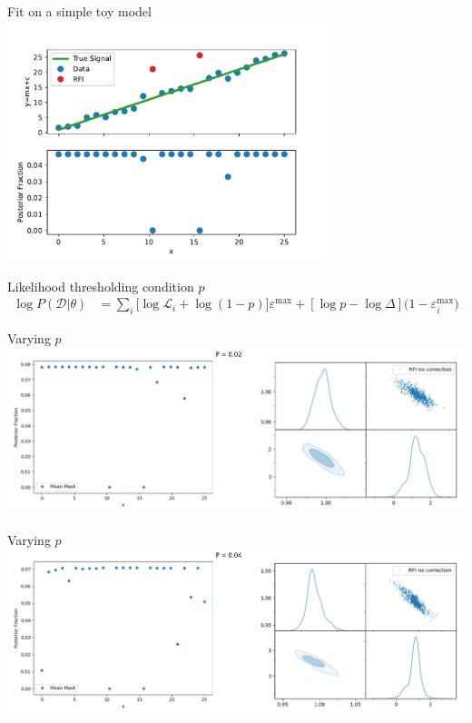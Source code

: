 \documentclass[aspectratio=169]{beamer}
\begin{document}
\begin{frame}{Fit on a simple toy model}
    \centering
    \includegraphics[width=0.7\textwidth]{images/test.pdf}
  \end{frame}

\begin{frame}{Likelihood thresholding condition $p$}
    \begin{equation}
    \begin{aligned}
    \log{P(\mathcal{D}|\theta)} &= \sum_{i}[{\log{\mathcal{L}_i}+\log({1-p})]\varepsilon^{\mathrm{max}} + [\log{p} - \log{\Delta}](1 - \varepsilon^\mathrm{max}_i})\label{eq:loglikelihood}
    \end{aligned}
    \end{equation}
    \centering
\end{frame}

\begin{frame}{Varying $p$}
    \centering
    \includegraphics[width=\textwidth]{images/gif_anest/comb_2.png}
\end{frame}

\begin{frame}{Varying $p$}
    \centering
    \includegraphics[width=\textwidth]{images/gif_anest/comb_3.png}
\end{frame}
\end{document}
